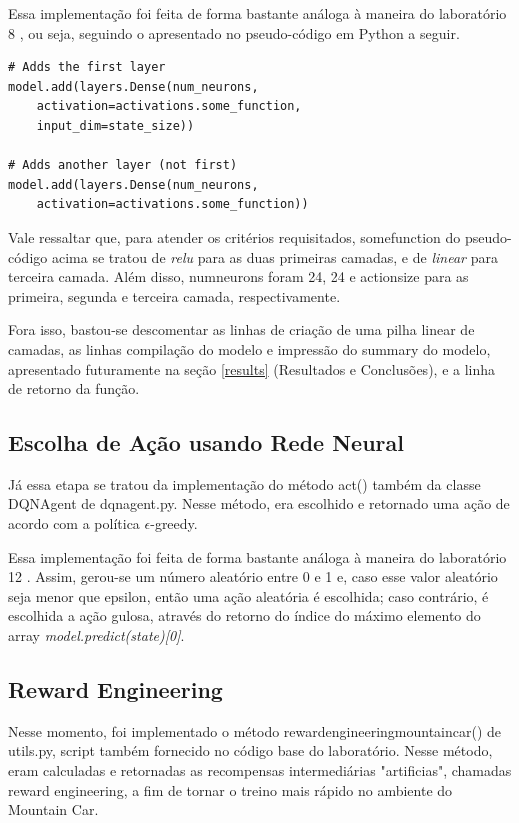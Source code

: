 \documentclass[conference]{IEEEtran}
\begin{document}
	Essa implementação foi feita de forma bastante análoga à maneira do laboratório 8 \cite{roteiro8}, ou seja, seguindo o apresentado no pseudo-código em Python a seguir.
	
\begin{lstlisting}
# Adds the first layer
model.add(layers.Dense(num_neurons,
	activation=activations.some_function,
	input_dim=state_size))

# Adds another layer (not first)
model.add(layers.Dense(num_neurons,
	activation=activations.some_function))
\end{lstlisting}

	Vale ressaltar que, para atender os critérios requisitados, some\underline{\space}function do pseudo-código acima se tratou de \textit{relu} para as duas primeiras camadas, e de \textit{linear} para terceira camada. Além disso, num\underline{\space}neurons foram 24, 24 e action\underline{\space}size para as primeira, segunda e terceira camada, respectivamente.

	Fora isso, bastou-se descomentar as linhas de criação de uma pilha linear de camadas, as linhas compilação do modelo e impressão do summary do modelo, apresentado futuramente na seção \ref{results} (Resultados e Conclusões), e a linha de retorno da função.

	\subsection{Escolha de Ação usando Rede Neural}

	Já essa etapa se tratou da implementação do método act() também da classe DQNAgent de dqn\underline{\space}agent.py. Nesse método, era escolhido e retornado uma ação de acordo com a política $\epsilon$-greedy.
	
	Essa implementação foi feita de forma bastante análoga à maneira do laboratório 12 \cite{roteiro12}. Assim, gerou-se um número aleatório entre 0 e 1 e, caso esse valor aleatório seja menor que epsilon, então uma ação aleatória é escolhida; caso contrário, é escolhida a ação gulosa, através do retorno do índice do máximo elemento do array \textit{model.predict(state)[0]}.
		
	\subsection{Reward Engineering}
	
	Nesse momento, foi implementado o método reward\underline{\space}engineering\underline{\space}mountain\underline{\space}car() de utils.py, script também fornecido no código base do laboratório. Nesse método, eram calculadas e retornadas as recompensas intermediárias "artificias", chamadas reward engineering, a fim de tornar o treino mais rápido no ambiente do Mountain Car.
	
\end{document}
